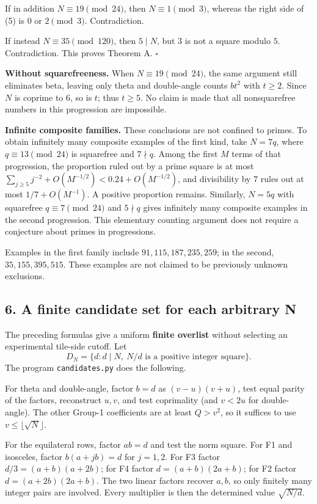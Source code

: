 \documentclass[
  11pt,
]{article}
\begin{document}
If in addition \(N\equiv19\pmod{24}\), then \(N\equiv1\pmod3\), whereas
the right side of (5) is \(0\) or \(2\pmod3\). Contradiction.

If instead \(N\equiv35\pmod{120}\), then \(5\mid N\), but \(3\) is not a
square modulo \(5\). Contradiction. This proves Theorem A. \(\square\)

\textbf{Without squarefreeness.} When \(N\equiv19\pmod{24}\), the same
argument still eliminates beta, leaving only theta and double-angle
counts \(bt^2\) with \(t\ge2\). Since \(N\) is coprime to \(6\), so is
\(t\); thus \(t\ge5\). No claim is made that all nonsquarefree numbers
in this progression are impossible.

\textbf{Infinite composite families.} These conclusions are not confined
to primes. To obtain infinitely many composite examples of the first
kind, take \(N=7q\), where \(q\equiv13\pmod{24}\) is squarefree and
\(7\nmid q\). Among the first \(M\) terms of that progression, the
proportion ruled out by a prime square is at most
\(\sum_{j\ge5}j^{-2}+O(M^{-1/2})<0.24+O(M^{-1/2})\), and divisibility by
\(7\) rules out at most \(1/7+O(M^{-1})\). A positive proportion
remains. Similarly, \(N=5q\) with squarefree \(q\equiv7\pmod{24}\) and
\(5\nmid q\) gives infinitely many composite examples in the second
progression. This elementary counting argument does not require a
conjecture about primes in progressions.

Examples in the first family include \(91,115,187,235,259\); in the
second, \(35,155,395,515\). These examples are not claimed to be
previously unknown exclusions.

\subsection{6. A finite candidate set for each arbitrary
N}\label{a-finite-candidate-set-for-each-arbitrary-n}

The preceding formulas give a uniform \textbf{finite overlist} without
selecting an experimental tile-side cutoff. Let
\[D_N=\{d:d\mid N,\ N/d\text{ is a positive integer square}\}.\] The
program \texttt{candidates.py} does the following.

For theta and double-angle, factor \(b=d\) as \((v-u)(v+u)\), test equal
parity of the factors, reconstruct \(u,v\), and test coprimality (and
\(v<2u\) for double-angle). The other Group-1 coefficients are at least
\(Q>v^2\), so it suffices to use \(v\le\lfloor\sqrt N\rfloor\).

For the equilateral rows, factor \(ab=d\) and test the norm square. For
F1 and isosceles, factor \(b(a+jb)=d\) for \(j=1,2\). For F3 factor
\(d/3=(a+b)(a+2b)\); for F4 factor \(d=(a+b)(2a+b)\); for F2 factor
\(d=(a+2b)(2a+b)\). The two linear factors recover \(a,b\), so only
finitely many integer pairs are involved. Every multiplier is then the
determined value \(\sqrt{N/d}\).
\end{document}

